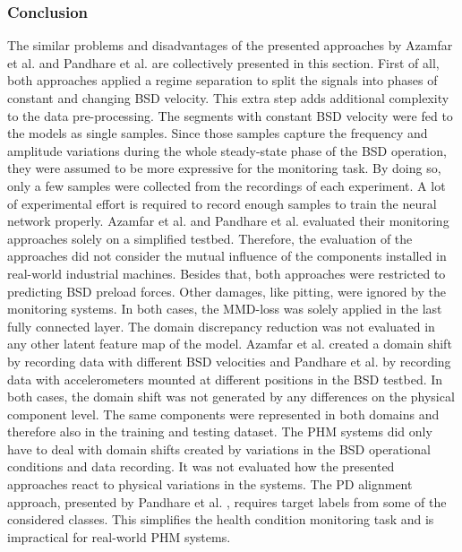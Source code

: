 \subsubsection{Conclusion}
The similar problems and disadvantages of the presented approaches by Azamfar et al. \cite{AZAMFAR2020103932} and Pandhare et al. \cite{Pandhare2021} are collectively presented in this section. First of all, both approaches applied a regime separation to split the signals into phases of constant and changing BSD velocity. This extra step adds additional complexity to the data pre-processing. The segments with constant BSD velocity were fed to the models as single samples. Since those samples capture the frequency and amplitude variations during the whole steady-state phase of the BSD operation, they were assumed to be more expressive for the monitoring task. By doing so, only a few samples were collected from the recordings of each experiment. A lot of experimental effort is required to record enough samples to train the neural network properly. Azamfar et al. \cite{AZAMFAR2020103932} and  Pandhare et al. \cite{Pandhare2021} evaluated their monitoring approaches solely on a simplified testbed. Therefore, the evaluation of the approaches did not consider the mutual influence of the components installed in real-world industrial machines. Besides that, both approaches were restricted to predicting BSD preload forces. Other damages, like pitting, were ignored by the monitoring systems. In both cases, the MMD-loss was solely applied in the last fully connected layer. The domain discrepancy reduction was not evaluated in any other latent feature map of the model. Azamfar et al. \cite{AZAMFAR2020103932} created a domain shift by recording data with different BSD velocities and Pandhare et al. \cite{Pandhare2021} by recording data with accelerometers mounted at different positions in the BSD testbed. In both cases, the domain shift was not generated by any differences on the physical component level. The same components were represented in both domains and therefore also in the training and testing dataset. The PHM systems did only have to deal with domain shifts created by variations in the BSD operational conditions and data recording. It was not evaluated how the presented approaches react to physical variations in the systems. The PD alignment approach, presented by Pandhare et al. \cite{Pandhare2021}, requires target labels from some of the considered classes. This simplifies the health condition monitoring task and is impractical for real-world PHM systems.

